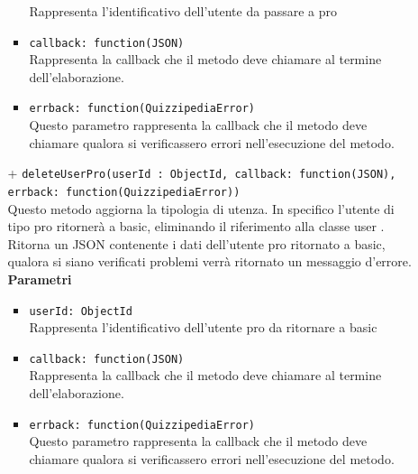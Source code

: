 \begin{itemize}
\begin{itemize}
\begin{itemize}
				Rappresenta l'identificativo dell'utente da passare a pro
			\item	
				\texttt{callback: function(JSON)} \\
				Rappresenta la callback che il metodo deve chiamare al termine dell'elaborazione.	
			\item	
				\texttt{errback: function(QuizzipediaError)} \\
				Questo parametro rappresenta la callback che il metodo deve chiamare qualora si verificassero errori nell'esecuzione del metodo.		
			\end{itemize}	
		+ \texttt{deleteUserPro(userId : ObjectId, callback: function(JSON), errback: function(QuizzipediaError))} \\	
		Questo metodo aggiorna la tipologia di utenza. In specifico l'utente di tipo pro ritornerà a basic, eliminando il riferimento alla classe user . Ritorna un JSON contenente i dati dell'utente pro ritornato a basic, qualora si siano verificati problemi verrà ritornato un messaggio d'errore.	\\	
		\textbf{Parametri} 
			\begin{itemize}
			\item
				\texttt{userId: ObjectId} \\
				Rappresenta l'identificativo dell'utente pro da ritornare a basic
			\item	
				\texttt{callback: function(JSON)} \\
				Rappresenta la callback che il metodo deve chiamare al termine dell'elaborazione.	
			\item	
				\texttt{errback: function(QuizzipediaError)} \\
				Questo parametro rappresenta la callback che il metodo deve chiamare qualora si verificassero errori nell'esecuzione del metodo.		
			\end{itemize}		
		\end{itemize}
		
\end{itemize}